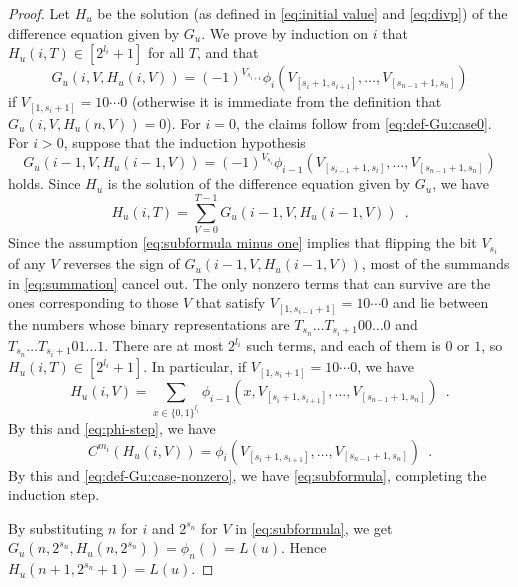 \documentclass[12pt,a4paper]{article}
\theoremstyle{definition}
\theoremstyle{remark}
\begin{document}
\begin{proof}
Let $H_u$ be the solution (as defined in 
\eqref{eq:initial value} and \eqref{eq:divp}) 
of the difference equation given by $G_u$. 
We prove by induction on $i$ 
that $H _u (i, T) \in [2^{l_i} + 1]$ for all $T$, and that 
\begin{equation} \label{eq:subformula}
  G_u(i,V,H_u(i,V)) = (-1)^{V_{s_{i+1}}} 
   \phi_i(V_{[s_i+1, s_{i+1}]}, \dots, V_{[s_{n-1}+1, s_n]})
\end{equation}
if $V_{[1, s_i +1]} = 10 \cdots 0$
(otherwise it is immediate from the definition that $G_u(i, V, H_u(n, V)) = 0$).
For $i = 0$, the claims follow from \eqref{eq:def-Gu:case0}.
For $i > 0$, suppose that the induction hypothesis
\begin{equation} \label{eq:subformula minus one}
  G _u (i - 1, V, H _u (i - 1, V)) = (-1) ^{V_{s_i}} 
   \phi _{i - 1} (V _{[s _{i - 1} + 1, s _i]}, \dots, V _{[s_{n-1}+1, s_n]}) 
\end{equation}
holds. 
Since $H _u$ is the solution of the difference equation given by $G _u$, we have
 \begin{equation} \label{eq:summation}
  H _u (i, T) 
  = \sum_{V = 0}^{T-1} G_u(i - 1, V, H_u(i - 1, V)) \enspace .
 \end{equation}
Since the assumption \eqref{eq:subformula minus one} 
implies that flipping the bit $V_{s_i}$ of
any $V$ reverses the sign of $G _u (i - 1, V, H _u(i - 1, V))$,
most of the summands in \eqref{eq:summation} cancel out.
The only nonzero terms that can survive 
are the ones corresponding to those $V$ 
that satisfy $V_{[1, s_{i - 1}+1]} = 10 \cdots 0$ and
lie between 
the numbers whose binary representations are
$T_{s_n} \dots T_{s_i+1} 00 \dots 0$ and 
$T_{s_n} \dots T_{s_i+1} 01 \dots 1$. 
There are at most $2 ^{l _i}$ such terms, 
and each of them is $0$ or $1$, 
so $H _u (i, T) \in [2 ^{l _i} + 1]$.
In particular, if $V_{[1,s_i+1]} = 10 \cdots 0$, we have
 \begin{equation}
  H _u (i, V) = \sum_{x \in \{0,1\}^{l_i}}
  \phi _{i - 1} (x, V_{[s_i+1, s_{i+1}]}, \dots, V_{[s_{n-1}+1, s_n]}) \enspace .
 \end{equation}
By this and \eqref{eq:phi-step}, we have 
 \begin{equation}
  C^{m_i} (H _u(i, V)) 
  = \phi _i (V_{[s_i+1, s_{i+1}]}, \dots, V_{[s_{n-1}+1, s_n]}) \enspace .
\end{equation}
By this and \eqref{eq:def-Gu:case-nonzero}, we have \eqref{eq:subformula}, 
completing the induction step.

By substituting $n$ for $i$ and $2^{s_n}$ for $V$ in \eqref{eq:subformula},
we get $G_u(n, 2^{s_n}, H_u(n,2^{s_n})) = \phi_n() = L (u)$.
Hence $H_u(n+1, 2^{s_n}+1) = L (u)$.
\end{proof}
\end{document}
